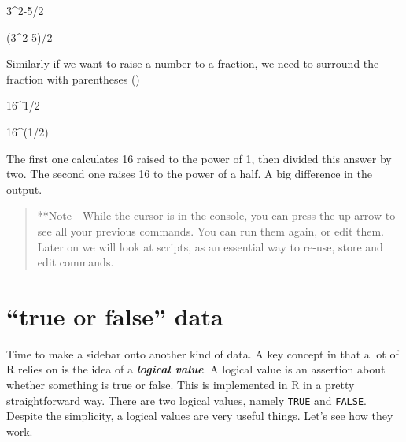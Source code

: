\documentclass[
]{book}
\newenvironment{Shaded}{\begin{snugshade}}{\end{snugshade}}
\newcommand{\DecValTok}[1]{\textcolor[rgb]{0.00,0.00,0.81}{#1}}
\newcommand{\NormalTok}[1]{#1}
\newcommand{\SpecialCharTok}[1]{\textcolor[rgb]{0.00,0.00,0.00}{#1}}
\begin{document}
\begin{Shaded}
\begin{Highlighting}[]
\DecValTok{3}\SpecialCharTok{\^{}}\DecValTok{2{-}5}\SpecialCharTok{/}\DecValTok{2}
\end{Highlighting}
\end{Shaded}

\begin{Shaded}
\begin{Highlighting}[]
\NormalTok{(}\DecValTok{3}\SpecialCharTok{\^{}}\DecValTok{2{-}5}\NormalTok{)}\SpecialCharTok{/}\DecValTok{2}
\end{Highlighting}
\end{Shaded}

Similarly if we want to raise a number to a fraction, we need to surround the fraction with parentheses ()

\begin{Shaded}
\begin{Highlighting}[]
\DecValTok{16}\SpecialCharTok{\^{}}\DecValTok{1}\SpecialCharTok{/}\DecValTok{2}
\end{Highlighting}
\end{Shaded}

\begin{Shaded}
\begin{Highlighting}[]
\DecValTok{16}\SpecialCharTok{\^{}}\NormalTok{(}\DecValTok{1}\SpecialCharTok{/}\DecValTok{2}\NormalTok{)}
\end{Highlighting}
\end{Shaded}

The first one calculates 16 raised to the power of 1, then divided this answer by two. The second one raises 16 to the power of a half. A big difference in the output.

\begin{quote}
**Note - While the cursor is in the console, you can press the up arrow to see all your previous commands.
You can run them again, or edit them. Later on we will look at scripts, as an essential way to re-use, store and edit commands.
\end{quote}

\hypertarget{true-or-false-data}{%
\section{``true or false'' data}\label{true-or-false-data}}

Time to make a sidebar onto another kind of data. A key concept in that a lot of R relies on is the idea of a \textbf{\emph{logical value}}. A logical value is an assertion about whether something is true or false. This is implemented in R in a pretty straightforward way. There are two logical values, namely \texttt{TRUE} and \texttt{FALSE}. Despite the simplicity, a logical values are very useful things. Let's see how they work.
\end{document}
